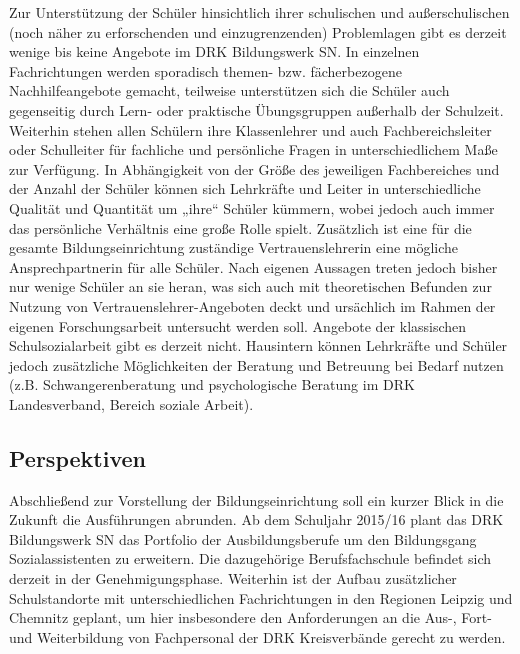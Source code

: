 Zur Unterstützung der Schüler hinsichtlich ihrer schulischen und außerschulischen (noch näher zu erforschenden und einzugrenzenden) Problemlagen gibt es derzeit wenige bis keine Angebote im DRK Bildungswerk SN. In einzelnen Fachrichtungen werden sporadisch themen- bzw. fächerbezogene Nachhilfeangebote gemacht, teilweise unterstützen sich die Schüler auch gegenseitig durch Lern- oder praktische Übungsgruppen außerhalb der Schulzeit. Weiterhin stehen allen Schülern ihre Klassenlehrer und auch Fachbereichsleiter oder Schulleiter für fachliche und persönliche Fragen in unterschiedlichem Maße zur Verfügung. In Abhängigkeit von der Größe des jeweiligen Fachbereiches und der Anzahl der Schüler können sich Lehrkräfte und Leiter in unterschiedliche Qualität und Quantität um „ihre“ Schüler kümmern, wobei jedoch auch immer das persönliche Verhältnis eine große Rolle spielt. Zusätzlich ist eine für die gesamte Bildungseinrichtung zuständige Vertrauenslehrerin eine mögliche Ansprechpartnerin für alle Schüler. Nach eigenen Aussagen treten jedoch bisher nur wenige Schüler an sie heran, was sich auch mit theoretischen Befunden zur Nutzung von Vertrauenslehrer-Angeboten deckt und ursächlich im Rahmen der eigenen Forschungsarbeit untersucht werden soll. Angebote der klassischen Schulsozialarbeit gibt es derzeit nicht. Hausintern können Lehrkräfte und Schüler jedoch zusätzliche Möglichkeiten der Beratung und Betreuung bei Bedarf nutzen (z.B. Schwangerenberatung und psychologische Beratung im DRK Landesverband, Bereich soziale Arbeit).  

\subsection{Perspektiven}
\label{sec:Perspektiven}

Abschließend zur Vorstellung der Bildungseinrichtung soll ein kurzer Blick in die Zukunft die Ausführungen abrunden. Ab dem Schuljahr 2015/16 plant das DRK Bildungswerk SN das Portfolio der Ausbildungsberufe um den Bildungsgang Sozialassistenten zu erweitern. Die dazugehörige Berufsfachschule befindet sich derzeit in der Genehmigungsphase. Weiterhin ist der Aufbau zusätzlicher Schulstandorte mit unterschiedlichen Fachrichtungen in den Regionen Leipzig und Chemnitz geplant, um hier insbesondere den Anforderungen an die Aus-, Fort- und Weiterbildung von Fachpersonal der DRK Kreisverbände gerecht zu werden.

